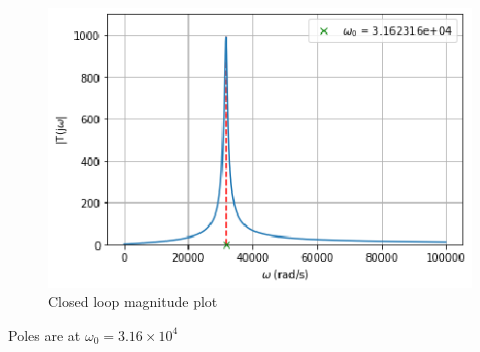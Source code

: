 \begin{enumerate}[label=\arabic*.,ref=\theenumi]
\begin{figure}[!ht]
    \centering
    \includegraphics[width=\columnwidth]{./figs/ee18btech11028/ee18btech11028_2_4.eps}
    \caption{Closed loop magnitude plot}
    \label{fig:ee18btech11026_2_4}
\end{figure}

Poles are at $\omega_{0} = 3.16 \times 10^{4}$


\end{enumerate}